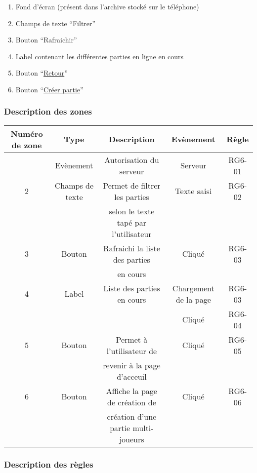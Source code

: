 \documentclass{report}
\begin{document}
		\begin{enumerate}
		  \item Fond d'écran (présent dans l'archive stocké sur le téléphone)
		  \item Champs de texte ``Filtrer''
		  \item Bouton ``Rafraichir''
		  \item Label contenant les différentes parties en ligne en cours
		  \item Bouton ``\hyperlink{Accueil}{Retour}''
		  \item Bouton ``\hyperlink{Creer partie multi-joueurs}{Créer partie}''
		\end{enumerate}

		\subsubsection{Description des zones}

			\begin{tabular}{|c|c|c|c|c|} \hline
				Numéro de zone & Type  & Description & Evènement &	Règle \\\hline
				  & Evènement & Autorisation du serveur & Serveur & RG6-01 \\\hline
				2 & Champs de texte & Permet de filtrer les parties & Texte saisi & RG6-02 \\
				  &                 & selon le texte tapé par l'utilisateur & & \\\hline
				3 & Bouton & Rafraichi la liste des parties & Cliqué & RG6-03 \\
				  &        & en cours & & \\\hline
				4 & Label & Liste des parties en cours & Chargement de la page & RG6-03 \\\
				  &       &                            & Cliqué & RG6-04 \\\hline
				5 & Bouton & Permet à l'utilisateur de & Cliqué & RG6-05 \\
				  &        & revenir à la page d'acceuil & & \\\hline
				6 & Bouton & Affiche la page de création de & Cliqué & RG6-06 \\
				  &        & création d'une partie multi-joueurs & & \\\hline    
			\end{tabular}

		\subsubsection{Description des règles}
\end{document}
